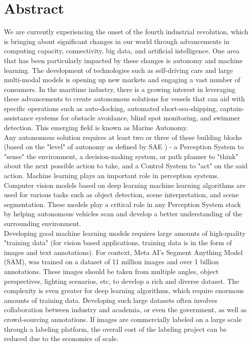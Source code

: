\chapter{Abstract}

We are currently experiencing the onset of the fourth industrial revolution, which is bringing about significant changes in our world through advancements in computing capacity, connectivity, big data, and artificial intelligence\cite{velarde2020artificial}. One area that has been particularly impacted by these changes is autonomy and machine learning. The development of technologies such as self-driving cars\cite{bertoncello2015ten} and large multi-modal models\cite{zhao2023survey} is opening up new markets and engaging a vast number of consumers. In the maritime industry, there is a growing interest in leveraging these advancements to create autonomous solutions for vessels\cite{gu2021autonomous} that can aid with specific operations such as auto-docking, automated short-sea-shipping, captain-assistance systems for obstacle avoidance, blind spot monitoring, and swimmer detection. This emerging field is known as Marine Autonomy. \\

Any autonomous solution requires at least two or three of these building blocks (based on the "level" of autonomy as defined by SAE \cite{on2014taxonomy}) - a Perception System to "sense" the environment, a decision-making system, or path planner to "think" about the next possible action to take, and a Control System to "act" on the said action\cite{bagloee2016autonomous}. Machine learning plays an important role in perception systems. Computer vision models based on deep learning machine learning algorithms are used for various tasks such as object detection, scene interpretation, and scene segmentation\cite{voulodimos2018deep}. These models play a critical role in any Perception System stack by helping autonomous vehicles scan and develop a better understanding of the surrounding environment.\cite{hane20173d} \\

Developing good machine learning models requires large amounts of high-quality "training data" (for vision based applications, training data is in the form of images and text annotations).\cite{radiuk2017impact} For context, Meta AI's Segment Anything Model (SAM), was trained on a dataset of 11 million images and over 1 billion annotations.\cite{kirillov2023segment} These images should be taken from multiple angles, object perspectives, lighting scenarios, etc, to develop a rich and diverse dataset. The complexity is even greater for deep learning algorithms, which require enormous amounts of training data. Developing such large datasets often involves collaboration between industry and academia, or even the government, as well as crowd-sourcing annotations. If images are commercially labeled on a large scale through a labeling platform, the overall cost of the labeling project can be reduced due to the economics of scale. \\

